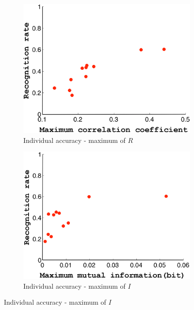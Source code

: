 \documentclass[10pt,twocolumn,letterpaper]{article}
\begin{document}
\begin{figure}[!t]
\begin{center}
        \begin{subfigure}[b]{0.23\textwidth}
                \includegraphics[width=\textwidth]{individual_accuracy_corr1.png}
                \caption{Individual accuracy - maximum of $R$}
                \label{sb1}
        \end{subfigure}
                \begin{subfigure}[b]{0.23\textwidth}
                \includegraphics[width=\textwidth]{individual_accuracy_mutinf1.png}
                \caption{Individual accuracy - maximum of $I$}
                \label{sb2}

\end{subfigure}
\end{center}
\end{figure}
\end{document}

